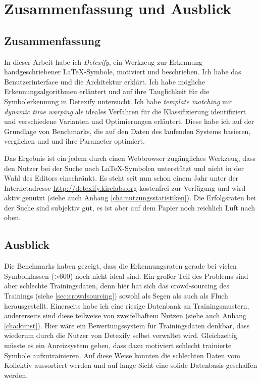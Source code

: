 \chapter{Zusammenfassung und Ausblick}
\label{cha:ausblick}

\section{Zusammenfassung}

In dieser Arbeit habe ich \emph{Detexify}, ein Werkzeug zur Erkennung handgeschriebener \LaTeX-Symbole, motiviert und beschrieben. Ich habe das Benutzerinterface und die Architektur erklärt. Ich habe mögliche Erkennungsalgorithmen erläutert und auf ihre Tauglichkeit für die Symbolerkennung in Detexify untersucht. Ich habe \emph{template matching} mit \emph{dynamic time warping} als ideales Verfahren für die Klassifizierung identifiziert und verschiedene Varianten und Optimierungen erläutert. Diese habe ich auf der Grundlage von Benchmarks, die auf den Daten des laufenden Systems basieren, verglichen und und ihre Parameter optimiert.

Das Ergebnis ist ein jedem durch einen Webbrowser zugängliches Werkzeug, dass den Nutzer bei der Suche nach \LaTeX-Symbolen unterstützt und nicht in der Wahl des Editors einschränkt. Es steht seit nun schon einem Jahr unter der Internetadresse \url{http://detexify.kirelabs.org} kostenfrei zur Verfügung und wird aktiv genutzt (siehe auch Anhang \ref{cha:nutzungsstatistiken}). Die Erfolgsraten bei der Suche sind subjektiv gut, es ist aber auf dem Papier noch reichlich Luft nach oben.

\section{Ausblick}

Die Benchmarks haben gezeigt, dass die Erkennungsraten gerade bei vielen Symbolklassen (>600) noch nicht ideal sind. Ein großer Teil des Problems sind aber schlechte Trainingsdaten, denn hier hat sich das crowd-sourcing des Trainings (siehe \ref{sec:crowdsourcing}) sowohl als Segen als auch als Fluch herausgestellt. Einerseits habe ich eine riesige Datenbank an Trainingsmustern, andererseits sind diese teilweise von zweifelhaftem Nutzen (siehe auch Anhang \ref{cha:kunst}). Hier wäre ein Bewertungssystem für Trainingsdaten denkbar, dass wiederum durch die Nutzer von Detexify selbst verwaltet wird. Gleichzeitig müsste es ein Anreizsystem geben, dass dazu motiviert schlecht trainierte Symbole aufzutrainieren. Auf diese Weise könnten die schlechten Daten vom Kollektiv aussortiert werden und auf lange Sicht eine solide Datenbasis geschaffen werden.

